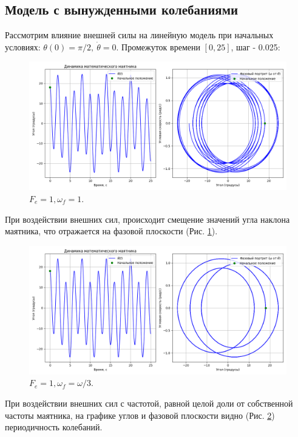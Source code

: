 \subsection*{Модель с вынужденными колебаниями}
Рассмотрим влияние внешней силы на линейную модель при начальных условиях: $\theta(0) = \pi /2, \ \dot{\theta} = 0$. Промежуток времени $[0,25]$, шаг - 0.025:
\begin{figure}[h]  %
	\centering
	\includegraphics[width=1\textwidth]{imgs/f1w1.png}  %
	\caption{$F_e = 1, \omega_f = 1$.}  %
	\label{fig:f1_w1}  %
\end{figure}

При воздействии внешних сил, происходит смещение значений угла наклона маятника, что отражается на фазовой плоскости (Рис. \ref{fig:f1_w1}).

\begin{figure}[h]  %
	\centering
	\includegraphics[width=1\textwidth]{imgs/f1ww3.png}  %
	\caption{$F_e = 1, \omega_f = \omega/3$.}  %
	\label{fig:f1_ww3}  %
\end{figure}

При воздействии внешних сил с частотой, равной целой доли от собственной частоты маятника, на графике углов и фазовой плоскости видно (Рис. \ref{fig:f1_ww3}) периодичность колебаний.

